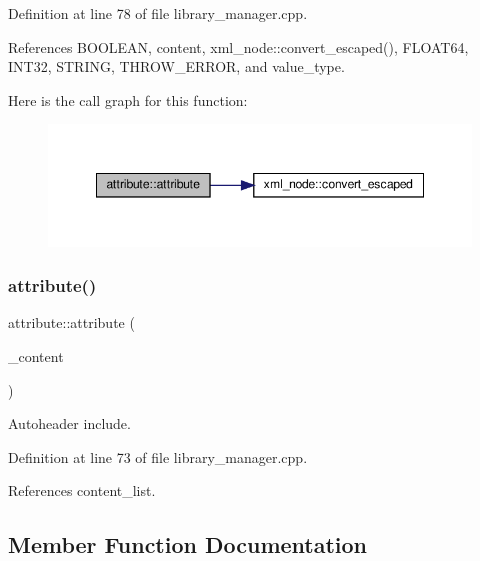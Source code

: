 Definition at line 78 of file library\+\_\+manager.\+cpp.



References B\+O\+O\+L\+E\+AN, content, xml\+\_\+node\+::convert\+\_\+escaped(), F\+L\+O\+A\+T64, I\+N\+T32, S\+T\+R\+I\+NG, T\+H\+R\+O\+W\+\_\+\+E\+R\+R\+OR, and value\+\_\+type.

Here is the call graph for this function\+:
\nopagebreak
\begin{figure}[H]
\begin{center}
\leavevmode
\includegraphics[width=348pt]{d9/d18/structattribute_a6bb99da6a48c7255b6259a112a998a1e_cgraph}
\end{center}
\end{figure}
\mbox{\label{structattribute_aa5ef8a27be9ea9a40d57a2c92ff68e3f}} 
\subsubsection{\texorpdfstring{attribute()}{attribute()}\hspace{0.1cm}{\footnotesize\ttfamily [3/3]}}
{\footnotesize\ttfamily attribute\+::attribute (\begin{DoxyParamCaption}\item[{const std\+::vector$<$ \hyperlink{library__manager_8hpp_a46399d2eacc03fb10f84fb33987ab8e3}{attribute\+Ref} $>$ \&}]{\+\_\+content }\end{DoxyParamCaption})\hspace{0.3cm}{\ttfamily [explicit]}}



Autoheader include. 



Definition at line 73 of file library\+\_\+manager.\+cpp.



References content\+\_\+list.



\subsection{Member Function Documentation}
\mbox{\label{structattribute_ae2d2ed4abd4d9c2f34a6f21229ab62ca}} 
